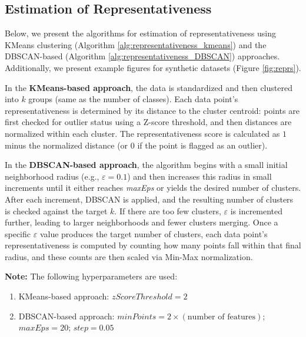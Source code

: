\documentclass[10pt,a4paper,oneside]{article}
\begin{document}
\subsection{Estimation of Representativeness}\label{1.2.1}
Below, we present the algorithms for estimation of representativeness using KMeans clustering (Algorithm \ref{alg:representativeness_kmeans}) and the DBSCAN-based (Algorithm \ref{alg:representativeness_DBSCAN}) approaches. Additionally, we present example figures for synthetic datasets (Figure \ref{fig:reprs}).

In the \textbf{KMeans-based approach}, the data is standardized and then clustered into \(k\) groups (same as the number of classes). Each data point’s representativeness is determined by its distance to the cluster centroid: points are first checked for outlier status using a Z-score threshold, and then distances are normalized within each cluster. The representativeness score is calculated as \(1\) minus the normalized distance (or \(0\) if the point is flagged as an outlier).

In the \textbf{DBSCAN-based approach}, the algorithm begins with a small initial neighborhood radius (e.g., \(\varepsilon = 0.1\)) and then increases this radius in small increments until it either reaches \textit{maxEps} or yields the desired number of clusters. After each increment, DBSCAN is applied, and the resulting number of clusters is checked against the target \(k\). If there are too few clusters, \(\varepsilon\) is incremented further, leading to larger neighborhoods and fewer clusters merging. Once a specific \(\varepsilon\) value produces the target number of clusters, each data point’s representativeness is computed by counting how many points fall within that final radius, and these counts are then scaled via Min-Max normalization.

\textbf{Note:} The following hyperparameters are used:
\begin{enumerate}
    \item KMeans-based approach: $zScoreThreshold = 2$
    \item DBSCAN-based approach: $minPoints = 2 \times (\text{number of features})$; $maxEps = 20$; $step = 0.05$ 
\end{enumerate}
\end{document}

